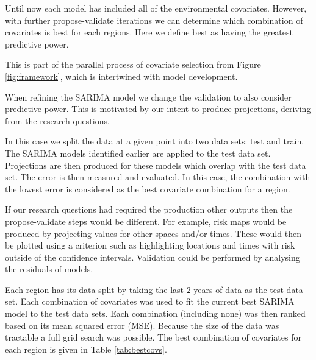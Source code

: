 \documentclass{article}
\begin{document}
Until now each model has included all of the environmental covariates. However, with further propose-validate iterations we can determine which combination of covariates is best for each regions. Here we define best as having the greatest predictive power.

This is part of the parallel process of covariate selection from Figure \ref{fig:framework}, which is intertwined with model development.

When refining the SARIMA model we change the validation to also consider predictive power. This is motivated by our intent to produce projections, deriving from the research questions.

In this case we split the data at a given point into two data sets: test and train. The SARIMA models identified earlier are applied to the test data set. Projections are then produced for these models which overlap with the test data set. The error is then measured and evaluated. In this case, the combination with the lowest error is considered as the best covariate combination for a region.

If our research questions had required the production other outputs then the propose-validate steps would be different. For example, risk maps would be produced by projecting values for other spaces and/or times. These would then be plotted using a criterion such as highlighting locations and times with risk outside of the confidence intervals. Validation could be performed by analysing the residuals of models.


Each region has its data split by taking the last 2 years of data as the test data set. Each combination of covariates was used to fit the current best SARIMA model to the test data sets. Each combination (including none) was then ranked based on its mean squared error (MSE). Because the size of the data was tractable a full grid search was possible. The best combination of covariates for each region is given in Table \ref{tab:bestcovs}.
\end{document}
